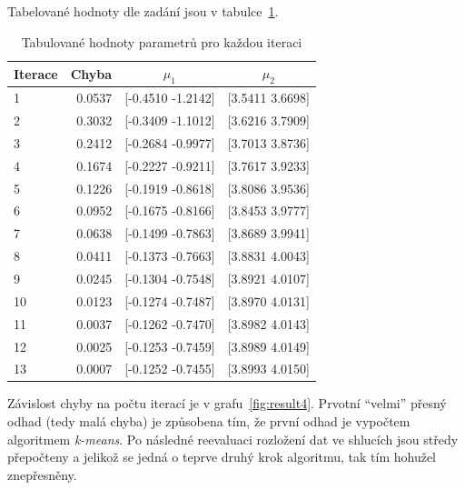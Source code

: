 Tabelované hodnoty dle zadání jsou v tabulce~\ref{table:table1}.

\begin{table}[htb]
    \centering

    \begin{tabular}{lrcc}
        \toprule

        Iterace & Chyba     & \( \mu_1 \)       & \( \mu_2 \)       \\ \midrule
        1       & 0.0537    & [-0.4510 -1.2142] & [3.5411 3.6698]   \\
        2       & 0.3032    & [-0.3409 -1.1012] & [3.6216 3.7909]   \\
        3       & 0.2412    & [-0.2684 -0.9977] & [3.7013 3.8736]   \\
        4       & 0.1674    & [-0.2227 -0.9211] & [3.7617 3.9233]   \\
        5       & 0.1226    & [-0.1919 -0.8618] & [3.8086 3.9536]   \\
        6       & 0.0952    & [-0.1675 -0.8166] & [3.8453 3.9777]   \\
        7       & 0.0638    & [-0.1499 -0.7863] & [3.8689 3.9941]   \\
        8       & 0.0411    & [-0.1373 -0.7663] & [3.8831 4.0043]   \\
        9       & 0.0245    & [-0.1304 -0.7548] & [3.8921 4.0107]   \\
        10      & 0.0123    & [-0.1274 -0.7487] & [3.8970 4.0131]   \\
        11      & 0.0037    & [-0.1262 -0.7470] & [3.8982 4.0143]   \\
        12      & 0.0025    & [-0.1253 -0.7459] & [3.8989 4.0149]   \\
        13      & 0.0007    & [-0.1252 -0.7455] & [3.8993 4.0150]   \\
          
        \bottomrule
    \end{tabular}

    \caption{Tabulované hodnoty parametrů pro každou iteraci}
    \label{table:table1}
\end{table}
\FloatBarrier

Závislost chyby na počtu iterací je v grafu~\ref{fig:result4}.
Prvotní \enquote{velmi} přesný odhad (tedy malá chyba) je způsobena tím, že první odhad je vypočtem algoritmem \textit{k-means}.
Po následné reevaluaci rozložení dat ve shlucích jsou středy přepočteny a jelikož se jedná o teprve druhý krok algoritmu, tak tím hohužel znepřesněny.

